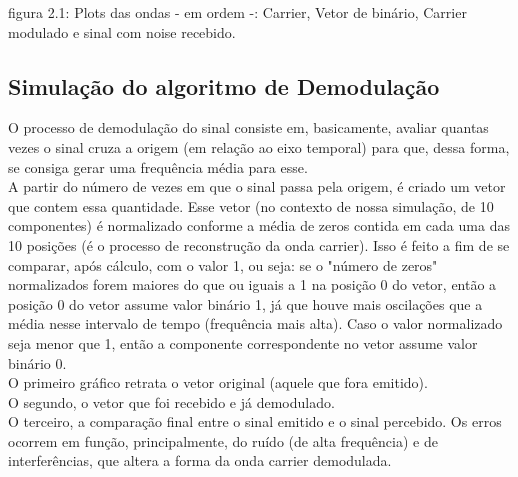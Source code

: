 \documentclass[11pt,a4paper]{report}
\begin{document}
\begin{center}
	{\footnotesize figura 2.1: Plots das ondas - em ordem -: Carrier, Vetor de binário, Carrier modulado e sinal com noise recebido.}
\end{center}

		\subsection{Simulação do algoritmo de Demodulação}
		O processo de demodulação do sinal consiste em, basicamente, avaliar quantas vezes o sinal cruza a origem (em relação ao eixo temporal) para que, dessa forma, se consiga gerar uma frequência média para esse.\\
		
		A partir do número de vezes em que o sinal passa pela origem, é criado um vetor que contem essa quantidade. Esse vetor (no contexto de nossa simulação, de 10 componentes) é normalizado conforme a média de zeros contida em cada uma das 10 posições (é o processo de reconstrução da onda carrier). Isso é feito a fim de se comparar, após cálculo, com o valor 1, ou seja: se o "número de zeros" normalizados forem maiores do que ou iguais a 1 na posição 0 do vetor, então a posição 0 do vetor assume valor binário 1, já que houve mais oscilações que a média nesse intervalo de tempo (frequência mais alta). Caso o valor normalizado seja menor que 1, então a componente correspondente no vetor assume valor binário 0.\\
		
		O primeiro gráfico retrata o vetor original (aquele que fora emitido).\\
		
		O segundo, o vetor que foi recebido e já demodulado.\\
		
		O terceiro, a comparação final entre o sinal emitido e o sinal percebido. Os erros ocorrem em função, principalmente, do ruído (de alta frequência) e de interferências, que altera a forma da onda carrier demodulada.
		
\end{document}
